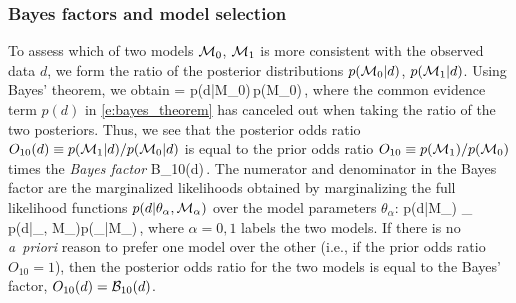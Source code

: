 \subsubsection{Bayes factors and model selection}
\label{s:bayes_factors}

To assess which of two models 
${\cal M}_0$, ${\cal M}_1$ is more consistent with
the observed data $d$, we form 
the ratio of the posterior distributions 
$p({\cal M}_0|d)$, $p({\cal M}_1|d)$.
Using Bayes' theorem, we obtain
\be
{} =
{p(d|{\cal M}_0)\,p({\cal M}_0)}\,,
\ee
%
where the common evidence term $p(d)$ in
\eqref{e:bayes_theorem} has canceled out 
when taking the ratio of the two posteriors.
Thus, we see that the posterior odds ratio
$O_{10}(d)\equiv p({\cal M}_1|d)/p({\cal M}_0|d)$
is equal to the prior odds ratio
$O_{10}\equiv p({\cal M}_1)/p({\cal M}_0)$
times the {\em Bayes factor}
%
\be
{\cal B}_{10}(d)\equiv {}\,.
\label{e:bayes_factor}
\ee
%
The numerator and denominator in the Bayes factor 
are the marginalized likelihoods obtained by 
marginalizing the full likelihood functions
$p(d|\theta_\alpha,{\cal M}_\alpha)$ over the 
model parameters $\theta_\alpha$:
%
\be
p(d|{\cal M}_\alpha) \equiv
{}\theta_\alpha\>
p(d|\theta_\alpha, {\cal M}_\alpha)p(\theta_\alpha|{\cal M}_\alpha)\,,
\ee
%
where $\alpha=0,1$ labels the two models.
If there is no {\em a~priori} reason to prefer one model over 
the other (i.e., if the prior odds ratio $O_{10}=1$), then the 
posterior odds ratio for the two models is equal to the 
Bayes' factor, $O_{10}(d) = {\cal B}_{10}(d)$.

